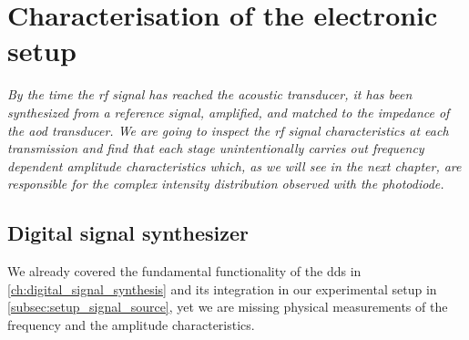 \chapter{Characterisation of the electronic setup}\label{ch:electronic_setup}

\textit{By the time the \gls{rf} signal has reached the acoustic transducer,
it has been synthesized from a reference signal, amplified, and matched to
the impedance of the \gls{aod} transducer. We are going to inspect the
\gls{rf} signal characteristics at each transmission and find that each stage
unintentionally carries out frequency dependent amplitude characteristics
which, as we will see in the next chapter, are responsible for the complex
intensity distribution observed with the photodiode.}

\section{Digital signal synthesizer}

We already covered the fundamental functionality of the \gls{dds} in
\cref{ch:digital_signal_synthesis} and its integration in our experimental
setup in \cref{subsec:setup_signal_source}, yet we are missing physical
measurements of the frequency and the amplitude characteristics.


